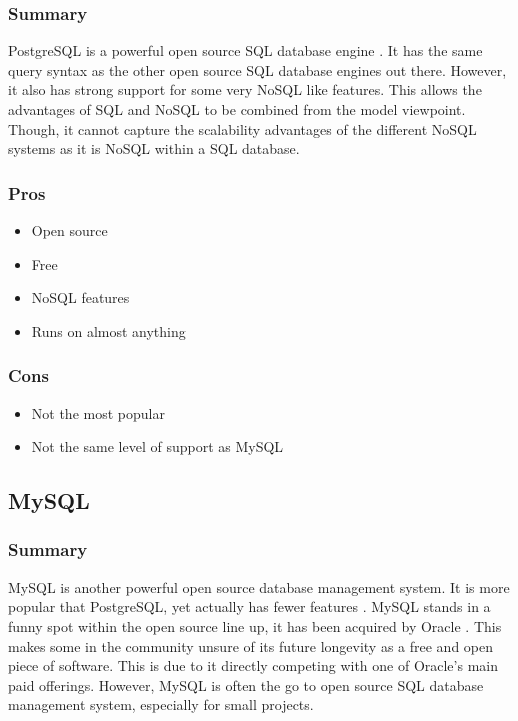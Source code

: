 \documentclass[draftclsnofoot,onecolumn,journal,letterpaper,compsoc,10pt]{IEEEtran}
\begin{document}
        \subsubsection{Summary}
        
        PostgreSQL is a powerful open source SQL database engine \cite{postgresql}.  It has the same query syntax as the other open source SQL database engines out there.  However, it also has strong support for some very NoSQL like features.  This allows the advantages of SQL and NoSQL to be combined from the model viewpoint.  Though, it cannot capture the scalability advantages of the different NoSQL systems as it is NoSQL within a SQL database.
        
        \subsubsection{Pros}
        \begin{itemize}
            \item Open source
            \item Free
            \item NoSQL features
            \item Runs on almost anything \cite{db_comparison}
        \end{itemize}
        
        \subsubsection{Cons}
        \begin{itemize}
            \item Not the most popular
            \item Not the same level of support as MySQL
        \end{itemize}
    
    \subsection{MySQL}
    
        \subsubsection{Summary}
        
        MySQL is another powerful open source database management system.  It is more popular that PostgreSQL, yet actually has fewer features \cite{db_comparison}.  MySQL stands in a funny spot within the open source line up, it has been acquired by Oracle \cite{mysql}.  This makes some in the community unsure of its future longevity as a free and open piece of software.  This is due to it directly competing with one of Oracle's main paid offerings.  However, MySQL is often the go to open source SQL database management system, especially for small projects.
        
\end{document}
